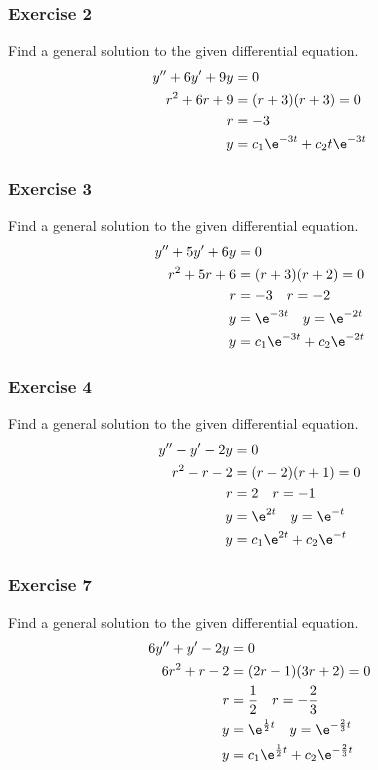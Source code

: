 \documentclass{math}
\begin{document}
\subsubsection*{Exercise 2}
Find a general solution to the given differential equation.
\begin{align*}
  y''+6y'+9y &= 0 \\
  r^2+6r+9 &= (r+3)(r+3) = 0 \\
  r &= -3 \\
  y &= c_1\e^{-3t}+c_2t\e^{-3t}
\end{align*}

\subsubsection*{Exercise 3}
Find a general solution to the given differential equation.
\begin{align*}
  y''+5y'+6y &= 0 \\
  r^2+5r+6 &= (r+3)(r+2) = 0 \\
  r &= -3 \quad r = -2 \\
  y &= \e^{-3t} \quad y = \e^{-2t} \\
  y &= c_1\e^{-3t}+c_2\e^{-2t}
\end{align*}

\subsubsection*{Exercise 4}
Find a general solution to the given differential equation.
\begin{align*}
  y''-y'-2y &= 0 \\
  r^2-r-2 &= (r-2)(r+1) = 0 \\
  r &= 2 \quad r = -1 \\
  y &= \e^{2t} \quad y = \e^{-t} \\
  y &= c_1\e^{2t}+c_2\e^{-t}
\end{align*}

\subsubsection*{Exercise 7}
Find a general solution to the given differential equation.
\begin{align*}
  6y''+y'-2y &= 0 \\
  6r^2+r-2 &= (2r-1)(3r+2) = 0 \\
  r &= \frac{1}{2} \quad r = -\frac{2}{3} \\
  y &= \e^{\frac{1}{2}t} \quad y = \e^{-\frac{2}{3}t} \\
  y &= c_1\e^{\frac{1}{2}t}+c_2\e^{-\frac{2}{3}t}
\end{align*}
\end{document}
